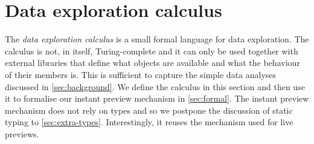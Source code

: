 \documentclass[english,crc,references=cleveref]{programming}
\theoremstyle{plain}
\theoremstyle{definition}
\begin{document}

\section{Data exploration calculus}
\label{sec:calculus}

The \emph{data exploration calculus} is a small formal language for data exploration. The calculus
is not, in itself, Turing-complete and it can only be used together with external libraries that
define what objects are available and what the behaviour of their members is. This is
sufficient to capture the simple data analyses discussed in \cref{sec:background}. We
define the calculus in this section and then use it to formalise our instant preview
mechanism in \cref{sec:formal}.
%
The instant preview mechanism does not rely on types and so we postpone the discussion of static
typing to \cref{sec:extra-types}. Interestingly, it reuses the mechanism used for live
previews.

\end{document}
